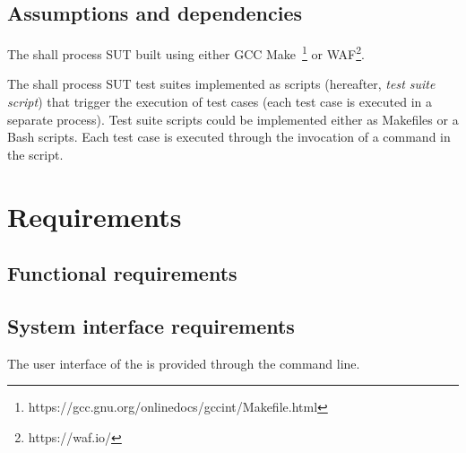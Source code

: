 \section{Assumptions and dependencies}

\RQ{} The \FAQAS shall process SUT built using either GCC Make~\footnote{https://gcc.gnu.org/onlinedocs/gccint/Makefile.html} or WAF\footnote{https://waf.io/}.


\RQ{} The \FAQAS shall process SUT test suites implemented as scripts (hereafter, \emph{test suite script}) that trigger the execution of test cases (each test case is executed in a separate process). Test suite scripts could be implemented either as Makefiles or a Bash scripts. Each test case is executed through the invocation of a command in the script.



\chapter{Requirements}

\section{Functional requirements}
\label{sec:requirements}






\section{System interface requirements}

\RQ{} The user interface of the \FAQAS is provided through the command line.

